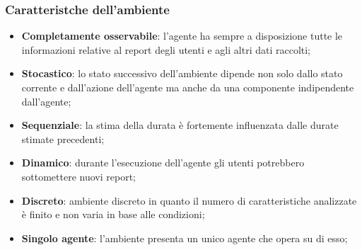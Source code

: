 \subsubsection{Caratteristche dell'ambiente}
\fancyhead{}    %
\label{paragrafo 1.2.1}
\par{
\begin{itemize}
    \item\textbf{Completamente osservabile}: l'agente ha sempre a disposizione tutte le informazioni relative al report degli utenti e agli altri dati raccolti;
    \item\textbf{Stocastico}: lo stato successivo dell’ambiente dipende non solo dallo stato corrente e dall’azione dell’agente ma anche da una componente indipendente dall’agente;
    \item\textbf{Sequenziale}: la stima della durata è fortemente influenzata dalle durate stimate precedenti;
    \item\textbf{Dinamico}: durante l'esecuzione dell'agente gli utenti potrebbero sottomettere nuovi report;
    \item\textbf{Discreto}: ambiente discreto in quanto il numero di caratteristiche analizzate è finito e non varia in base alle condizioni;
    \item\textbf{Singolo agente}: l'ambiente presenta un unico agente che opera su di esso;
\end{itemize}
}